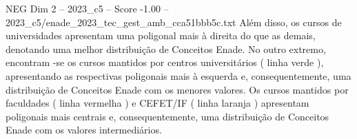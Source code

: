 \begin{textsample}{NEG Dim 2 – 2023\_c5 – Score -1.00 – 2023\_c5/enade\_2023\_tec\_gest\_amb\_cca51bbb5c.txt}
Além disso, os cursos de universidades apresentam uma poligonal mais à direita do que as demais, denotando uma melhor distribuição de Conceitos Enade.
No outro extremo, encontram -se os cursos mantidos por centros universitários ( linha verde ), apresentando as respectivas poligonais mais à esquerda e, consequentemente, uma distribuição de Conceitos Enade com os menores valores.
Os cursos mantidos por faculdades ( linha vermelha ) e CEFET/IF ( linha laranja ) apresentam poligonais mais centrais e, consequentemente, uma distribuição de Conceitos Enade com os valores intermediários.

\end{textsample}
